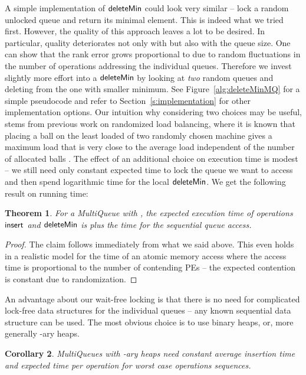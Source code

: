 \documentclass[a4paper,12pt]{article}
\newcommand{\Id}[1]{\ensuremath{\text{{\sf #1}}}}
\newtheorem{theorem}{Theorem}
\newtheorem{corollary}[theorem]{Corollary}
\begin{document}
A simple implementation of \Id{deleteMin} could look very similar -- lock a random unlocked queue and return its minimal element. This is indeed what we tried first. However, the quality of this approach leaves a lot to be desired. In particular, quality deteriorates not only with  but also with the queue size. One can show that the rank error grows proportional to  due to random
fluctuations in the number of operations addressing the individual queues.
Therefore we invest slightly more effort into a \Id{deleteMin} by looking at \emph{two} random queues and deleting from the one with smaller minimum. See Figure~\ref{alg:deleteMinMQ} for a simple pseudocode and refer to Section~\ref{s:implementation} for other implementation options.  Our intuition why considering two choices 
may be useful, stems from previous work on randomized load balancing, where it is known that placing a ball on the least loaded of two randomly chosen machine gives a maximum load that is very close to the average load independent of the number of allocated balls \cite{BCSV00}.
The effect of an additional choice on execution time is modest -- we still need only constant expected time to lock the queue we want to access and then spend logarithmic time for the local \Id{deleteMin}. We get the following result on 
running time:

\begin{theorem}
For a MultiQueue with , the expected execution time of operations \Id{insert} and \Id{deleteMin} is  plus the time for the sequential queue access.
\end{theorem}
\begin{proof}
The claim follows immediately from what we said above. This even holds in a realistic model for the time of an atomic memory access where
the access time is proportional to the number of contending PEs --
the expected contention is constant due to randomization.
\end{proof}

An advantage about our wait-free locking is that there is no need for complicated lock-free data structures for the individual queues -- any known sequential data structure can be used. The most obvious choice is to use binary heaps, or, more generally -ary heaps.

\begin{corollary}
MultiQueues with -ary heaps need constant average insertion time and 
expected time  per operation for worst case operations sequences.
\end{corollary}
 
\end{document}

